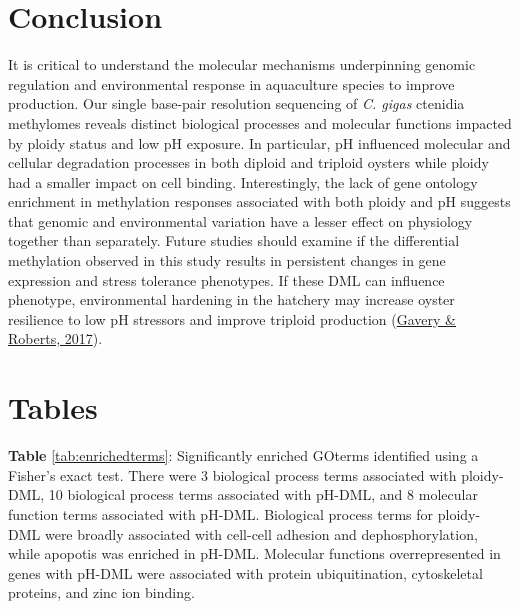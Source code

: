 \documentclass [11pt, proquest] {uwthesis}[2015/03/03]
\begin{document}
\hypertarget{conclusion-3}{%
\section{Conclusion}\label{conclusion-3}}

It is critical to understand the molecular mechanisms underpinning genomic regulation and environmental response in aquaculture species to improve production. Our single base-pair resolution sequencing of \emph{C. gigas} ctenidia methylomes reveals distinct biological processes and molecular functions impacted by ploidy status and low pH exposure. In particular, pH influenced molecular and cellular degradation processes in both diploid and triploid oysters while ploidy had a smaller impact on cell binding. Interestingly, the lack of gene ontology enrichment in methylation responses associated with both ploidy and pH suggests that genomic and environmental variation have a lesser effect on physiology together than separately. Future studies should examine if the differential methylation observed in this study results in persistent changes in gene expression and stress tolerance phenotypes. If these DML can influence phenotype, environmental hardening in the hatchery may increase oyster resilience to low pH stressors and improve triploid production (\protect\hyperlink{ref-Gavery2017}{Gavery \& Roberts, 2017}).

\clearpage

\hypertarget{tables-3}{%
\section{Tables}\label{tables-3}}

\textbf{Table} \ref{tab:enrichedterms}: Significantly enriched GOterms identified using a Fisher's exact test. There were 3 biological process terms associated with ploidy-DML, 10 biological process terms associated with pH-DML, and 8 molecular function terms associated with pH-DML. Biological process terms for ploidy-DML were broadly associated with cell-cell adhesion and dephosphorylation, while apopotis was enriched in pH-DML. Molecular functions overrepresented in genes with pH-DML were associated with protein ubiquitination, cytoskeletal proteins, and zinc ion binding.
\end{document}
